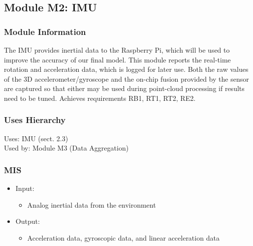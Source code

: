 \documentclass[11pt]{article}
\begin{document}
		\subsection{Module M2: IMU}
		\label{sec:M2}
			\subsubsection{Module Information}
			The IMU provides inertial data to the Raspberry Pi, which will be used to improve the accuracy of our final model. This module reports the real-time rotation and acceleration data, which is logged for later use. Both the raw values of the 3D accelerometer/gyroscope and the on-chip fusion provided by the sensor are captured so that either may be used during point-cloud processing if results need to be tuned. Achieves requirements RB1, RT1, RT2, RE2.
			\subsubsection{Uses Hierarchy}
				Uses: IMU (sect. 2.3) \\
				Used by: Module M3 (Data Aggregation)
			\subsubsection{MIS}
				\begin{itemize}
					\item Input:
						\begin{itemize}
							\item Analog inertial data from the environment
						\end{itemize}
					\item Output:
						\begin{itemize}
							\item Acceleration data, gyroscopic data, and linear acceleration data
						\end{itemize}
				\end{itemize}
\end{document}
